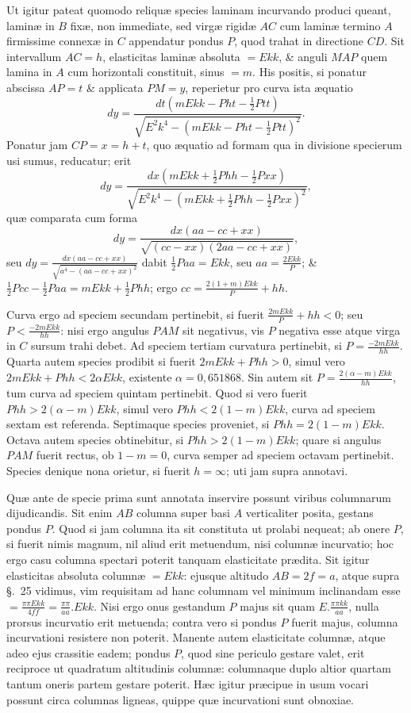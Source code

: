 Ut igitur pateat quomodo reliquæ species laminam incurvando produci queant, laminæ in $B$ fixæ, non immediate, sed virgæ rigidæ $AC$ cum laminæ termino $A$ firmissime connexæ in $C$ appendatur pondus $P$, quod trahat in directione $CD$. Sit intervallum $AC=h$, elasticitas laminæ absoluta $=Ekk$, \& anguli $MAP$ quem lamina in $A$ cum horizontali constituit, sinus $=m$. His positis, si ponatur abscissa $AP=t$ \& applicata $PM=y$, reperietur pro curva ista æquatio
\[dy=\frac{dt(mEkk-Pht-\frac12Ptt)}{\sqrt{E^2k^4-(mEkk-Pht-\frac12Ptt)^2}}.\]
Ponatur jam $CP=x=h+t$, quo æquatio ad formam qua in divisione specierum usi sumus, reducatur; erit
\[dy=\frac{dx(mEkk+\frac12Phh-\frac12Pxx)}{\sqrt{E^2k^4-(mEkk+\frac12Phh-\frac12Pxx)^2}},\]
quæ comparata cum forma
\[dy=\frac{dx(aa-cc+xx)}{\sqrt{(cc-xx)(2aa-cc+xx)}},\]
seu $dy=\frac{dx(aa-cc+xx)}{\sqrt{a^4-(aa-cc+xx)^2}}$ dabit $\frac12Paa=Ekk$, seu $aa=\frac{2Ekk}P$; \& $\frac12Pcc-\frac12Paa=mEkk+\frac12Phh$; ergo $cc=\frac{2(1+m)Ekk}P+hh$.

Curva ergo ad speciem secundam pertinebit, si fuerit $\frac{2mEkk}P+hh<0$; seu $P<\frac{-2mEkk}{hh}$: nisi ergo angulus $PAM$ sit negativus, vis $P$ negativa esse atque virga in $C$ sursum trahi debet. Ad speciem tertiam curvatura pertinebit, si $P=\frac{-2mEkk}{hh}$. Quarta autem species prodibit si fuerit $2mEkk+Phh>0$, simul vero $2mEkk+Phh<2\alpha Ekk$, existente $\alpha=0{,}651868$. Sin autem sit $P=\frac{2(\alpha-m)Ekk}{hh}$, tum curva ad speciem quintam pertinebit. Quod si vero fuerit $Phh>2(\alpha-m)Ekk$, simul vero $Phh<2(1-m)Ekk$, curva ad speciem sextam est referenda. Septimaque species proveniet, si $Phh=2(1-m)Ekk$. Octava autem species obtinebitur, si $Phh>2(1-m)Ekk$; quare si angulus $PAM$ fuerit rectus, ob $1-m=0$, curva semper ad speciem octavam pertinebit. Species denique nona orietur, si fuerit $h=\infty$; uti jam supra annotavi.

Quæ ante de specie prima sunt annotata inservire possunt viribus columnarum dijudicandis. Sit enim $AB$ columna super basi $A$ verticaliter posita, gestans pondus $P$. Quod si jam columna ita sit constituta ut prolabi nequeat; ab onere $P$, si fuerit nimis magnum, nil aliud erit metuendum, nisi columnæ incurvatio; hoc ergo casu columna spectari poterit tanquam elasticitate prædita. Sit igitur elasticitas absoluta columnæ $=Ekk$: ejusque altitudo $AB=2f=a$, atque supra §.~25 vidimus, vim requisitam ad hanc columnam vel minimum inclinandam esse $=\frac{\pi\pi Ekk}{4ff}=\frac{\pi\pi}{aa}.Ekk$. Nisi ergo onus gestandum $P$ majus sit quam $E.\frac{\pi\pi kk}{aa}$, nulla prorsus incurvatio erit metuenda; contra vero si pondus $P$ fuerit majus, columna incurvationi resistere non poterit. Manente autem elasticitate columnæ, atque adeo ejus crassitie eadem; pondus $P$, quod sine periculo gestare valet, erit reciproce ut quadratum altitudinis columnæ: columnaque duplo altior quartam tantum oneris partem gestare poterit. Hæc igitur præcipue in usum vocari possunt circa columnas ligneas, quippe quæ incurvationi sunt obnoxiae.


